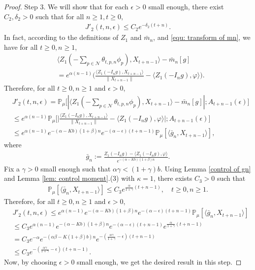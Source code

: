 \documentclass[12pt,a4paper]{amsart}
\theoremstyle{plain}
\theoremstyle{definition}
\numberwithin{equation}{section}
\begin{document}
\begin{proof}
    Step 3.
    We will show that for each $\epsilon > 0$ small enough, there exist $C_2,\delta_2>0$ such that for all $n\geq 1, t\geq 0$,
\begin{align}
\label{eq:31step31}
    J'_2(t,n,\epsilon)
    \leq C_2 e^{-\delta_2(t+n)}.
\end{align}
    In fact, according to the definitions of $Z_1$ and $\bar{m}_n$, and \eqref{equ: transform of mn}, we have for all $t\geq 0, n\geq1$,
\begin{align}
    &\langle Z_1(-\sum_{p\in \mathcal{N}}\theta_{t,p,n}\phi_p), X_{t+n-1}\rangle-\bar{m}_n[g]\\
    &=e^{\alpha(n-1)}\Big(\frac{\langle Z_1(-I_ng),X_{t+n-1}\rangle}{\|X_{t+n-1}\|}-\langle Z_1(-I_ng),\varphi\rangle\Big).
\end{align}
    Therefore, for all $t\geq 0, n\geq1$ and $\epsilon > 0$,
\begin{align}
    &J'_2(t,n,\epsilon)
	= \mathbb{P}_{\mu}\big[|\langle Z_1(-\sum_{p\in\mathcal{N}}\theta_{t,p,n}\phi_p),X_{t+n-1}\rangle-\bar{m}_n[g]|; A_{t+n-1}(\epsilon)\big]\\
	&\leq e^{\alpha(n-1)}\mathbb{P}_{\mu}\Big[\big|\frac{\langle Z_1(-I_ng),X_{t+n-1}\rangle}{\|X_{t+n-1}\|}-\langle Z_1(-I_ng),\varphi\rangle\big|;A_{t+n-1}(\epsilon)\Big]\\
	&\leq e^{\alpha(n-1)}e^{-(\alpha-Kb)(1+\beta)n}e^{-(\alpha-\epsilon)(t+n-1)}\mathbb{P}_{\mu}
    [\langle \bar {g}_n, X_{t+n-1}\rangle],
\end{align}
    where
\begin{align}
    \bar{g}_n
    :=\frac{Z_1(-I_ng)-\langle Z_1(-I_ng),\varphi\rangle}{e^{-(\alpha-Kb)(1+\beta)n}}.
\end{align}
    Fix a $\gamma>0$ small enough such that $\alpha \gamma < (1+\gamma)b$.
    Using Lemma \ref{control of gn} and Lemma \ref{lem: control moment}.(3) with $\kappa=1$, there exists $C_3>0$ such that
\begin{align}
    \mathbb{P}_{\mu}[\langle \bar{g}_n, X_{t+n-1}\rangle]
    \leq C_3e^{\frac{\alpha}{1+\gamma}(t+n-1)},\quad t\geq0, n\geq 1.
\end{align}
    Therefore, for all $t\geq 0, n\geq1$ and $\epsilon >0$,
\begin{align}
    &J'_2(t,n,\epsilon)\leq e^{\alpha(n-1)}e^{-(\alpha-Kb)(1+\beta)n}e^{-(\alpha-\epsilon)(t+n-1)}\mathbb{P}_{\mu}[\langle \bar{g}_n, X_{t+n-1}\rangle]\\
    &\leq C_3 e^{\alpha(n-1)}e^{-(\alpha-Kb)(1+\beta)n}e^{-(\alpha-\epsilon)(t+n-1)}e^{\frac{\alpha }{1+\gamma}(t+n-1)}\\
    &=C_3e^{-\alpha}e^{-(\alpha\beta-K(1+\beta)b)n}e^{-(\frac{\alpha\gamma}{1+\gamma}-\epsilon)(t+n-1)}\\&\leq C_3e^{-(\frac{\alpha\gamma}{1+\gamma}-\epsilon)(t+n-1)}.
\end{align}
    Now, by choosing $\epsilon >0$ small enough, we get the desired result in this step.



\end{proof}
\end{document}
